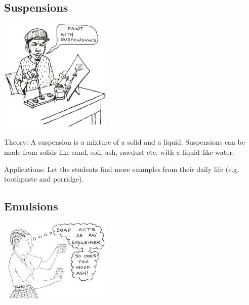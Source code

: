 \begin{multicols}{2}
\subsection{Suspensions}

\begin{center}
\includegraphics[width=0.4\textwidth]{./img/source/suspensions.jpg}
\end{center}

\begin{description*}
\item[Theory:]{A suspension is a mixture of a solid and a
liquid. Suspensions can be made from solids
like sand, soil, ash, sawdust etc. with a liquid
like water. }
\item[Applications:]{Let the students find more examples
from their daily life (e.g. toothpaste and
porridge).}
\end{description*}

\subsection{Emulsions} %

\begin{center}
\includegraphics[width=0.4\textwidth]{./img/source/emulsions.jpg}
\end{center}


\end{multicols}
